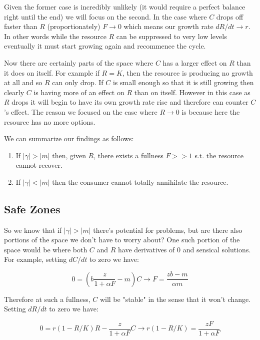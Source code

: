 \documentclass[11pt,a5paper]{book}
\begin{document}
Given the former case is incredibly unlikely (it would require a perfect balance right until the end) we will focus on the second. In the case where $C$ drops off faster than $R$ (proportionately) $F\rightarrow 0$ which means our growth rate $dR/dt\rightarrow r$. In other words while the resource $R$ can be suppressed to very low levels eventually it must start growing again and recommence the cycle.
\newline

Now there are certainly parts of the space where $C$ has a larger effect on $R$ than it does on itself. For example if $R=K$, then the resource is producing no growth at all and so $R$ can only drop. If $C$ is small enough so that it is still growing then clearly $C$ is having more of an effect on $R$ than on itself. However in this case as $R$ drops it will begin to have its own growth rate rise and therefore can counter $C$'s effect. The reason we focused on the case where $R\rightarrow 0$ is because here the resource has no more options. \newline

We can summarize our findings as follows:

\begin{enumerate}
\item If $|\gamma| > |m|$ then, given $R$, there exists a fullness $F>>1$ s.t. the resource cannot recover.
\item If $|\gamma| < |m|$ then the consumer cannot totally annihilate the resource. 
\end{enumerate}

\subsection{Safe Zones}

So we know that if $|\gamma| > |m|$ there's potential for problems, but are there also portions of the space we don't have to worry about? One such portion of the space would be where both $C$ and $R$ have derivatives of 0 and sensical solutions. For example, setting $dC/dt$ to zero we have:

$$0 = \left( b\frac{z}{1+\alpha F}-m \right)C \rightarrow F= \frac{zb-m}{\alpha m}$$

Therefore at such a fullness, $C$ will be "stable" in the sense that it won't change. Setting $dR/dt$ to zero we have:

$$0 = r(1-R/K)R-\frac{z}{1+\alpha F}C \rightarrow r(1-R/K)=\frac{zF}{1+\alpha F}$$
\end{document}
